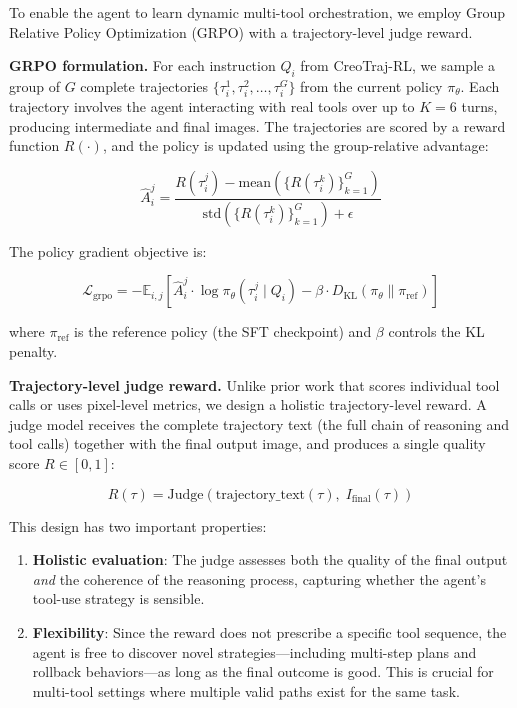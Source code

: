 \documentclass[11pt]{article}
\begin{document}
To enable the agent to learn dynamic multi-tool orchestration, we employ Group Relative Policy Optimization (GRPO) \cite{shao2024deepseekmath} with a trajectory-level judge reward.

\textbf{GRPO formulation.} For each instruction $Q_i$ from CreoTraj-RL, we sample a group of $G$ complete trajectories $\{\tau_i^1, \tau_i^2, \ldots, \tau_i^G\}$ from the current policy $\pi_\theta$. Each trajectory involves the agent interacting with real tools over up to $K=6$ turns, producing intermediate and final images. The trajectories are scored by a reward function $R(\cdot)$, and the policy is updated using the group-relative advantage:

$$\hat{A}_i^j = \frac{R(\tau_i^j) - \text{mean}(\{R(\tau_i^k)\}_{k=1}^G)}{\text{std}(\{R(\tau_i^k)\}_{k=1}^G) + \epsilon}$$

The policy gradient objective is:

$$\mathcal{L}_{\text{grpo}} = -\mathbb{E}_{i,j} \left[ \hat{A}_i^j \cdot \log \pi_\theta(\tau_i^j \mid Q_i) - \beta \cdot D_{\text{KL}}(\pi_\theta \| \pi_{\text{ref}}) \right]$$

where $\pi_{\text{ref}}$ is the reference policy (the SFT checkpoint) and $\beta$ controls the KL penalty.

\textbf{Trajectory-level judge reward.} Unlike prior work that scores individual tool calls \cite{lin2025jarvisart} or uses pixel-level metrics, we design a holistic trajectory-level reward. A judge model receives the complete trajectory text (the full chain of reasoning and tool calls) together with the final output image, and produces a single quality score $R \in [0, 1]$:

$$R(\tau) = \text{Judge}(\text{trajectory\_text}(\tau), \; I_{\text{final}}(\tau))$$

This design has two important properties:

\begin{enumerate}
    \item \textbf{Holistic evaluation}: The judge assesses both the quality of the final output \textit{and} the coherence of the reasoning process, capturing whether the agent's tool-use strategy is sensible.
    \item \textbf{Flexibility}: Since the reward does not prescribe a specific tool sequence, the agent is free to discover novel strategies—including multi-step plans and rollback behaviors—as long as the final outcome is good. This is crucial for multi-tool settings where multiple valid paths exist for the same task.
\end{enumerate}
\end{document}
